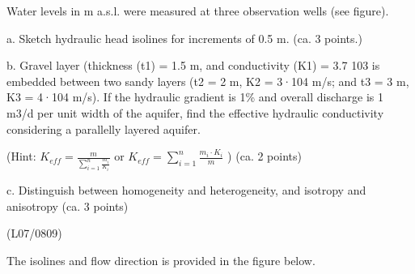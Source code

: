 \documentclass[letterpaper,10pt,english]{jupyterBook}
\begin{document}
\sphinxAtStartPar
Water levels in m a.s.l. were measured at three observation wells (see figure).



\sphinxAtStartPar
a. Sketch hydraulic head isolines for increments of 0.5 m. (ca. 3 points.)

\sphinxAtStartPar
b. Gravel layer (thickness (t1) = 1.5 m, and conductivity (K1) = 3.7 10\sphinxhyphen{}3 is embedded between two sandy layers (t2 = 2 m, K2 = 3·10\sphinxhyphen{}4 m/s; and t3 = 3 m, K3 = 4·10\sphinxhyphen{}4 m/s). If the hydraulic gradient is 1\% and overall discharge is 1 m3/d per unit width of the aquifer, find the effective hydraulic conductivity considering a parallelly layered aquifer.

\sphinxAtStartPar
(Hint: \(K_{eff} = \frac{m}{\sum_{i=1}^n \frac{m_i}{K_i}}\) or \(K_{eff} =  \sum_{i=1}^n\frac{m_i\cdot K_i}{m}\)  ) (ca. 2 points)

\sphinxAtStartPar
c. Distinguish between homogeneity and heterogeneity, and isotropy and anisotropy (ca. 3 points)

\sphinxAtStartPar
{}
(L07/08\sphinxhyphen{}09)

\sphinxAtStartPar
The isolines and flow direction is provided in the figure below.
\end{document}

